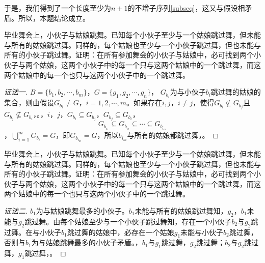 \documentclass{beamer}
\begin{document}
\begin{CJK*}{UTF8}{gbsn}
\begin{frame}
 \pause  于是，\pause 我们得到了一个长度至少为$n+1$的不增子序列\eqref{subseq}，\pause 这又与假设相矛盾。\pause 所以，\pause 本题结论成立。

\end{frame}
\begin{frame}
  \begin{Exercise}
    毕业舞会上，小伙子与姑娘跳舞。已知每个小伙子至少与一个姑娘跳过舞，但未能与所有的姑娘跳过舞。同样的，每个姑娘也至少与一个小伙子跳过舞，但也未能与所有的小伙子跳过舞。证明：在所有参加舞会的小伙子与姑娘中，必可找到两个小伙子与两个姑娘，这两个小伙子中的每一个只与这两个姑娘中的一个跳过舞，而这两个姑娘中的每一个也只与这两个小伙子中的一个跳过舞。
  \end{Exercise}\pause
  \begin{proof}[证法一]
    $B=\{b_1,b_2,\cdots,b_m\}$，$G=\{g_1,g_2,\cdots,g_n\}$， \pause $G_{b_i}$为与小伙子$b_i$跳过舞的姑娘的集合，\pause 则由假设$G_{b_i}\neq G$，\pause $i=1,2,\cdots,m$。\pause 如果存在$i, j$，\pause $i \neq j$，\pause 使得$G_{b_i}\nsubseteq G_{b_j}$且$G_{b_j}\nsubseteq G_{b_i}$，。，$i$，$j$，$G_{b_i}\subseteq G_{b_j}$，$G_{b_j}\subseteq G_{b_i}$，\[G_{b_{i_1}}\subseteq G_{b_{i_2}}\subseteq \cdots \subseteq G_{b_{i_m}}\]，\pause $\bigcup_{i=1}^mG_{b_i} = G$，\pause 即$G_{b_{i_m}}=G$，\pause 所以$b_{i_m}$与所有的姑娘都跳过舞，。
  \end{proof}
\end{frame}
\begin{frame}
  \begin{Exercise}
    毕业舞会上，小伙子与姑娘跳舞。已知每个小伙子至少与一个姑娘跳过舞，但未能与所有的姑娘跳过舞。同样的，每个姑娘也至少与一个小伙子跳过舞，但也未能与所有的小伙子跳过舞。证明：在所有参加舞会的小伙子与姑娘中，必可找到两个小伙子与两个姑娘，这两个小伙子中的每一个只与这两个姑娘中的一个跳过舞，而这两个姑娘中的每一个也只与这两个小伙子中的一个跳过舞。
  \end{Exercise}\pause
  \begin{proof}[证法二]$b_1$为与姑娘跳舞最多的小伙子。$b_1$未能与所有的姑娘跳过舞知，$g_2$，\pause $b_1$未能与$g_2$跳过舞。\pause 由每个姑娘至少与一个小伙子跳过舞知，\pause 存在一个小伙子$b_2$与$g_2$跳过舞。\pause 在与小伙子$b_1$跳过舞的姑娘中，\pause 必存在一个姑娘$g_1$未能与小伙子$b_2$跳过舞，\pause 否则与$b_1$为与姑娘跳舞最多的小伙子矛盾。，\pause $b_1$与$g_1$跳过舞，$g_2$跳过舞；\pause $b_2$与$g_2$跳过舞，$g_1$跳过舞，。  
  \end{proof}
  

\end{frame}
\end{CJK*}
\end{document}
